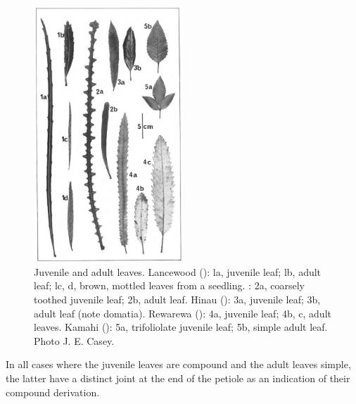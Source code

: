 \begin{figure}
	\includegraphics[width=0.5\textwidth]{graphics/figure19leaves.jpg}
	\centering
	\caption[Juvenile and adult leaves]{Juvenile and adult leaves.
Lancewood (): la, juvenile leaf; lb, adult leaf; lc, d, brown, mottled leaves from a seedling. : 2a, coarsely toothed juvenile leaf; 2b, adult leaf.
Hinau (): 3a, juvenile leaf; 3b, adult leaf (note domatia).
Rewarewa (): 4a, juvenile leaf; 4b, c, adult leaves.
Kamahi (): 5a, trifoliolate juvenile leaf; 5b, simple adult leaf.
Photo  J. E. Casey.}%
	\label{fig:19leaves}
\end{figure}

In all cases where the juvenile leaves are compound and the adult leaves simple, the latter have a distinct joint at the end of the petiole as an indication of their compound derivation.

